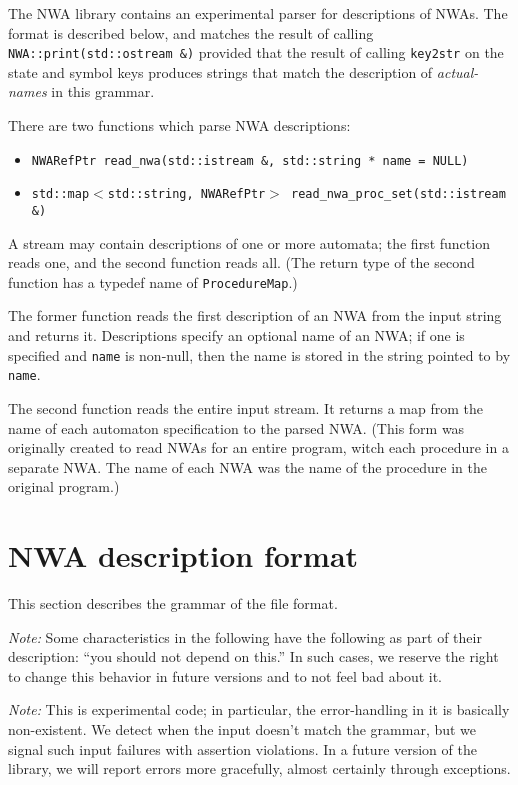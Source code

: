 The NWA library contains an experimental parser for descriptions of
NWAs. The format is described below, and matches the result of calling
\texttt{NWA::print(std::ostream \&)} provided that the result of
calling \texttt{key2str} on the state and symbol keys produces strings
that match the description of \textsl{actual-names} in this grammar.

There are two functions which parse NWA descriptions:
\begin{itemize}
  \item\texttt{NWARefPtr read\_nwa(std::istream \&, std::string * name = NULL)}
  \item\texttt{std::map$<$std::string, NWARefPtr$>$ read\_nwa\_proc\_set(std::istream \&)}
\end{itemize}
A stream may contain descriptions of one or more automata; the first
function reads one, and the second function reads all.  (The return
type of the second function has a typedef name of
\texttt{ProcedureMap}.)

The former function reads the first description of an NWA from the
input string and returns it. Descriptions specify an optional name of
an NWA; if one is specified and \texttt{name} is non-null, then the
name is stored in the string pointed to by \texttt{name}.

The second function reads the entire input stream. It returns a map
from the name of each automaton specification to the parsed NWA. (This
form was originally created to read NWAs for an entire program, witch
each procedure in a separate NWA. The name of each NWA was the name of
the procedure in the original program.)

\section{NWA description format}

This section describes the grammar of the file format.

\textsl{Note:} Some characteristics in the following have the
following as part of their description: ``you should not depend on
this.'' In such cases, we reserve the right to change this behavior in
future versions and to not feel bad about it.

\textsl{Note:} This is experimental code; in particular, the
error-handling in it is basically non-existent. We detect when the
input doesn't match the grammar, but we signal such input failures
with assertion violations. In a future version of the library, we will
report errors more gracefully, almost certainly through exceptions.

